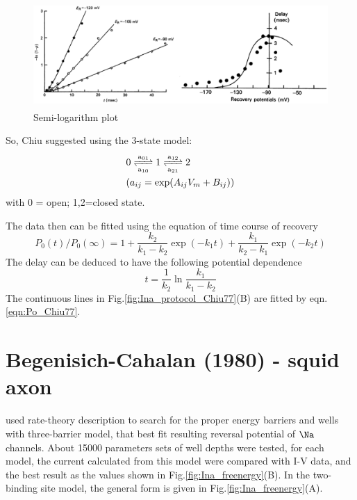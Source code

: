\begin{figure}[hbt]
 \centerline{\includegraphics[height=4cm,
 angle=0]{./images/Ina_log_Chiu77.eps}} 
 \caption{Semi-logarithm plot}
\label{fig:Ina_log_Chiu77}
\end{figure}


So, Chiu suggested using the 3-state model:
\begin{equation*}
\begin{split}
&\ce{0 <=>[a_{01}][a_{10}] 1 <=>[a_{12}][a_{21}] 2}  \\
& (a_{ij} = \exp(A_{ij}V_m + B_{ij}))
\end{split}
\end{equation*}
with 0 = open; 1,2=closed state.

  The data then can be fitted using the equation of time course of recovery
  \begin{equation}\label{eqn:Po_Chiu77}
  P_0(t)/P_0(\infty) = 1 + \frac{k_2}{k_1-k_2}\exp(-k_1t) +
  \frac{k_1}{k_2-k_1}\exp(-k_2t)
  \end{equation}
  The delay can be deduced to have the following potential dependence
  \begin{equation}
  t = \frac{1}{k_2}\ln\frac{k_1}{k_1-k_2}
  \end{equation}
  The continuous lines in Fig.\ref{fig:Ina_protocol_Chiu77}(B) are fitted by
  eqn.\ref{eqn:Po_Chiu77}. 
  

\section{Begenisich-Cahalan (1980) - squid axon}
\label{sec:Ina_Begenesich1980}

\citep{begenisich1980, begenesich1980b} used rate-theory description to search
for the proper energy barriers and wells with three-barrier model, that best fit
resulting reversal potential of $\Na$ channels. About 15000 parameters sets of
well depths were tested, for each model, the current calculated from this model
were compared with I-V data, and the best result as the values shown in
Fig.\ref{fig:Ina_freenergy}(B). In the two-binding site model, the general form is given in
Fig.\ref{fig:Ina_freenergy}(A). 

